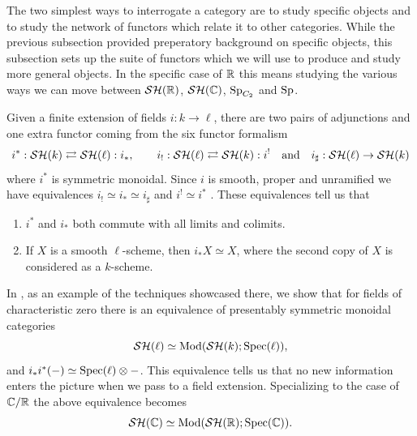The two simplest ways to interrogate a category are to study specific objects %
and to study the network of functors which relate it to other categories.
While the previous subsection provided preperatory background on specific objects, this subsection sets up the suite of functors which we will use to produce and study more general objects.
In the specific case of $\mathbb{R}$ this means studying the various ways we can move between $\mathcal{SH}(\mathbb{R})$, $\mathcal{SH}(\mathbb{C})$, $\operatorname{\mathrm{Sp}}_{C_2}$ and $\operatorname{\mathrm{Sp}}$.



\begin{rec} \label{rec:fields}
  Given a finite extension of fields $i : k \to \ell$, there are two pairs of adjunctions and one extra functor coming from the six functor formalism
  \[ i^* : \mathcal{SH}(k) \rightleftarrows \mathcal{SH}(\ell) : i_*, \qquad i_! : \mathcal{SH}(\ell) \rightleftarrows \mathcal{SH}(k) : i^! \quad \mathrm{ and } \quad i_{\sharp} : \mathcal{SH}(\ell) \to \mathcal{SH}(k) \]
  where $i^*$ is symmetric monoidal.
  Since $i$ is smooth, proper and unramified we have equivalences $i_! \simeq i_* \simeq i_{\sharp}$ and $i^! \simeq i^*$ \cite[Theorems 6.9 and 6.18]{hoyois}.
  These equivalences tell us that
  \begin{enumerate}
  \item $i^*$ and $i_*$ both commute with all limits and colimits.
  \item If $X$ is a smooth $\ell$-scheme, then $i_*X \simeq X$, where the second copy of $X$ is considered as a $k$-scheme.
  \end{enumerate}
\end{rec}

In , as an example of the techniques showcased there, we show that for fields of characteristic zero
there is an equivalence of presentably symmetric monoidal categories
\[ \mathcal{SH}(\ell) \simeq \mathrm{Mod} ( \mathcal{SH}(k) ; \operatorname{\mathrm{Spec}}(\ell) ), \]
and $i_*i^*(-) \simeq \operatorname{\mathrm{Spec}}(\ell) \otimes -$.
This equivalence tells us that no new information enters the picture when we pass to a field extension.
Specializing to the case of $\mathbb{C}/\mathbb{R}$ the above equivalence becomes
\[ \mathcal{SH}(\mathbb{C}) \simeq  \mathrm{Mod} ( \mathcal{SH}(\mathbb{R}) ; \operatorname{\mathrm{Spec}}(\mathbb{C}) ). \]

